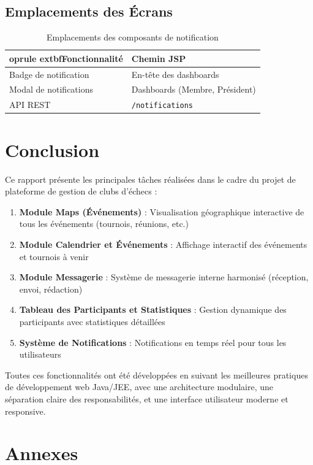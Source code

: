 \documentclass[12pt,a4paper]{article}
\begin{document}
\subsection{Emplacements des Écrans}
\begin{table}[h]
\centering
\begin{tabular}{ll}
	oprule
	extbf{Fonctionnalité} & \textbf{Chemin JSP} \\
\midrule
Badge de notification & En-tête des dashboards \\
Modal de notifications & Dashboards (Membre, Président) \\
API REST & \texttt{/notifications} \\
\bottomrule
\end{tabular}
\caption{Emplacements des composants de notification}
\end{table}

\section{Conclusion}


Ce rapport présente les principales tâches réalisées dans le cadre du projet de plateforme de gestion de clubs d'échecs :


\begin{enumerate}
    \item \textbf{Module Maps (Événements)} : Visualisation géographique interactive de tous les événements (tournois, réunions, etc.)
    \item \textbf{Module Calendrier et Événements} : Affichage interactif des événements et tournois à venir
    \item \textbf{Module Messagerie} : Système de messagerie interne harmonisé (réception, envoi, rédaction)
    \item \textbf{Tableau des Participants et Statistiques} : Gestion dynamique des participants avec statistiques détaillées
    \item \textbf{Système de Notifications} : Notifications en temps réel pour tous les utilisateurs
\end{enumerate}

Toutes ces fonctionnalités ont été développées en suivant les meilleures pratiques de développement web Java/JEE, avec une architecture modulaire, une séparation claire des responsabilités, et une interface utilisateur moderne et responsive.

\section{Annexes}
\end{document}
